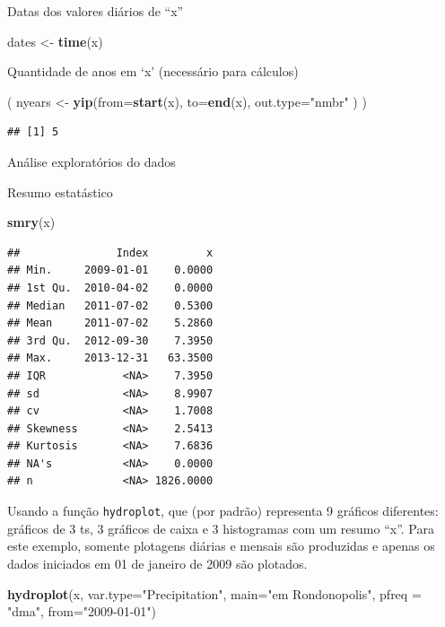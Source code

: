 \documentclass[
]{book}
\newenvironment{Shaded}{\begin{snugshade}}{\end{snugshade}}
\newcommand{\DataTypeTok}[1]{\textcolor[rgb]{0.13,0.29,0.53}{#1}}
\newcommand{\KeywordTok}[1]{\textcolor[rgb]{0.13,0.29,0.53}{\textbf{#1}}}
\newcommand{\NormalTok}[1]{#1}
\newcommand{\StringTok}[1]{\textcolor[rgb]{0.31,0.60,0.02}{#1}}
\begin{document}
Datas dos valores diários de ``x''

\begin{Shaded}
\begin{Highlighting}[]
\NormalTok{dates <-}\StringTok{ }\KeywordTok{time}\NormalTok{(x)}
\end{Highlighting}
\end{Shaded}

Quantidade de anos em `x' (necessário para cálculos)

\begin{Shaded}
\begin{Highlighting}[]
\NormalTok{( nyears <-}\StringTok{ }\KeywordTok{yip}\NormalTok{(}\DataTypeTok{from=}\KeywordTok{start}\NormalTok{(x), }\DataTypeTok{to=}\KeywordTok{end}\NormalTok{(x), }\DataTypeTok{out.type=}\StringTok{"nmbr"}\NormalTok{ ) )}
\end{Highlighting}
\end{Shaded}

\begin{verbatim}
## [1] 5
\end{verbatim}

Análise exploratórios do dados

Resumo estatástico

\begin{Shaded}
\begin{Highlighting}[]
\KeywordTok{smry}\NormalTok{(x)}
\end{Highlighting}
\end{Shaded}

\begin{verbatim}
##               Index         x
## Min.     2009-01-01    0.0000
## 1st Qu.  2010-04-02    0.0000
## Median   2011-07-02    0.5300
## Mean     2011-07-02    5.2860
## 3rd Qu.  2012-09-30    7.3950
## Max.     2013-12-31   63.3500
## IQR            <NA>    7.3950
## sd             <NA>    8.9907
## cv             <NA>    1.7008
## Skewness       <NA>    2.5413
## Kurtosis       <NA>    7.6836
## NA's           <NA>    0.0000
## n              <NA> 1826.0000
\end{verbatim}

Usando a função \texttt{hydroplot}, que (por padrão) representa 9 gráficos diferentes: gráficos de 3 ts, 3 gráficos de caixa e 3 histogramas com um resumo ``x''. Para este exemplo, somente plotagens diárias e mensais são produzidas e apenas os dados iniciados em 01 de janeiro de 2009 são plotados.

\begin{Shaded}
\begin{Highlighting}[]
\KeywordTok{hydroplot}\NormalTok{(x, }\DataTypeTok{var.type=}\StringTok{"Precipitation"}\NormalTok{, }\DataTypeTok{main=}\StringTok{"em Rondonopolis"}\NormalTok{,}
          \DataTypeTok{pfreq =} \StringTok{"dma"}\NormalTok{, }\DataTypeTok{from=}\StringTok{"2009-01-01"}\NormalTok{)}
\end{Highlighting}
\end{Shaded}
\end{document}
